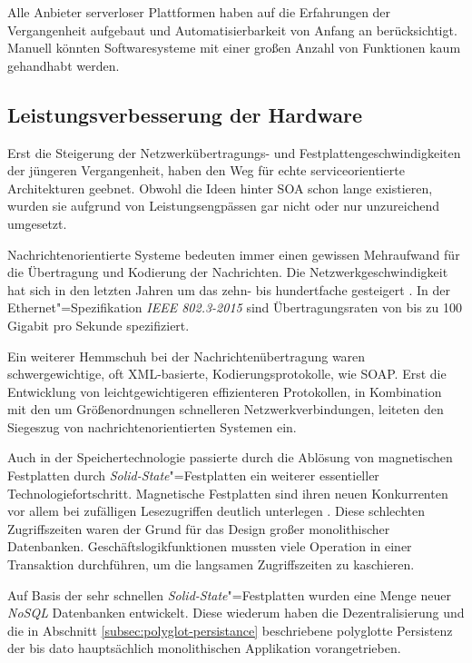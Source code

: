 Alle Anbieter serverloser Plattformen haben auf die Erfahrungen der Vergangenheit aufgebaut und Automatisierbarkeit von Anfang an berücksichtigt. Manuell könnten Softwaresysteme mit einer großen Anzahl von Funktionen kaum gehandhabt werden. 

\subsection{Leistungsverbesserung der Hardware}

Erst die Steigerung der Netzwerkübertragungs- und Festplattengeschwindigkeiten der jüngeren Vergangenheit, haben den Weg für echte serviceorientierte Architekturen geebnet. Obwohl die Ideen hinter SOA schon lange existieren, wurden sie aufgrund von Leistungsengpässen gar nicht oder nur unzureichend umgesetzt.

Nachrichtenorientierte Systeme bedeuten immer einen gewissen Mehraufwand für die Übertragung und Kodierung der Nachrichten. Die Netzwerkgeschwindigkeit hat sich in den letzten Jahren um das zehn- bis hundertfache gesteigert \cite{IEEEBandwidth}. In der Ethernet"=Spezifikation \textit{IEEE 802.3-2015} sind Übertragungsraten von bis zu 100 Gigabit pro Sekunde spezifiziert.

Ein weiterer Hemmschuh bei der Nachrichtenübertragung waren schwergewichtige, oft XML-basierte, Kodierungsprotokolle, wie \zB SOAP. Erst die Entwicklung von leichtgewichtigeren \bzw effizienteren Protokollen, in Kombination mit den um Größenordnungen schnelleren Netzwerkverbindungen, leiteten den Siegeszug von nachrichtenorientierten Systemen ein.

Auch in der Speichertechnologie passierte durch die Ablösung von magnetischen Festplatten durch \textit{Solid-State}"=Festplatten ein weiterer essentieller Technologiefortschritt. Magnetische Festplatten sind ihren neuen Konkurrenten vor allem bei zufälligen Lesezugriffen deutlich unterlegen \cite{Regola:2012:CMV:2379436.2379437}. Diese schlechten Zugriffszeiten waren der Grund für das Design großer monolithischer Datenbanken. Geschäftslogikfunktionen mussten viele Operation in einer Transaktion durchführen, um die langsamen Zugriffszeiten zu kaschieren.

Auf Basis der sehr schnellen \textit{Solid-State}"=Festplatten wurden eine Menge neuer \textit{NoSQL} Datenbanken entwickelt. Diese wiederum haben die Dezentralisierung und die in Abschnitt \ref{subsec:polyglot-persistance} beschriebene polyglotte Persistenz der bis dato hauptsächlich monolithischen Applikation vorangetrieben.

